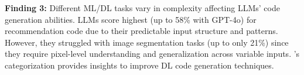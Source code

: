 

\begin{tcolorbox}[boxrule=0.5pt, colback=gray!10,  arc=4pt,left=3pt,right=3pt,top=3pt,bottom=3pt,boxsep=0pt
]
\textbf{Finding 3:} Different ML/DL tasks vary in complexity affecting LLMs' code generation abilities.
LLMs score highest (up to 58\% with GPT-4o) for recommendation code due to their predictable input structure and patterns.
However, they struggled with image segmentation tasks (up to only 21\%) since they require pixel-level understanding and generalization across variable inputs. \tool's categorization provides insights to improve DL code generation techniques.
\end{tcolorbox}


%


